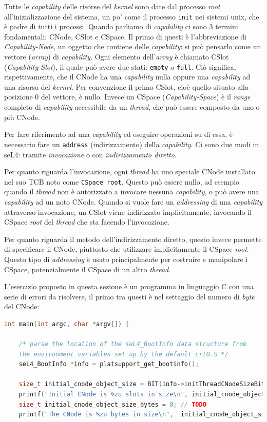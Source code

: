 Tutte le \textit{capability} delle risorse del \textit{kernel} sono date dal processo \textit{root} all'inizializzazione del sistema, un po' come il processo \texttt{init} nei sistemi unix, che è padre di tutti i processi. Quando parliamo di \textit{capability} ci sono 3 termini fondamentali: CNode, CSlot e CSpace. Il primo di questi è l'abbreviazione di \textit{Capability-Node}, un oggetto che contiene delle \textit{capability}: si può pensarlo come un vettore (\textit{array}) di \textit{capability}. Ogni elemento dell'\textit{array} è chiamato CSlot (\textit{Capability-Slot}), il quale può avere due stati: \texttt{empty} o \texttt{full}. Ciò significa, rispettivamente, che il CNode ha una \textit{capability} nulla oppure una \textit{capability} ad una risorsa del \textit{kernel}. Per convenzione il primo CSlot, cioè quello situato alla posizione 0 del vettore, è nullo. Invece un CSpace (\textit{Capability-Space}) è il \textit{range} completo di \textit{capability} accessibile da un \textit{thread}, che può essere composto da uno o più CNode.

Per fare riferimento ad una \textit{capability} ed eseguire operazioni su di essa, è necessario fare un \texttt{address} (indirizzamento) della \textit{capability}. Ci sono due modi in seL4: tramite \textit{invocazione} o con \textit{indirizzamento diretto}.

Per quanto riguarda l'invocazione, ogni \textit{thread} ha uno speciale CNode installato nel suo TCB noto come \texttt{CSpace root}. Questo può essere nullo, ad esempio quando il \textit{thread} non è autorizzato a invocare nessuna \textit{capability}, o può avere una \textit{capability} ad un noto CNode. Quando si vuole fare un \textit{addressing} di una \textit{capability} attraverso invocazione, un CSlot viene indirizzato implicitamente, invocando il CSpace \textit{root} del \textit{thread} che sta facendo l'invocazione.

Per quanto riguarda il metodo dell'indirizzamento diretto, questo invece permette di specificare il CNode, piuttosto che utilizzare implicitamente il CSpace \textit{root}. Questo tipo di \textit{addressing}  è usato principalmente per costruire e manipolare i CSpace, potenzialmente il CSpace di un altro \textit{thread}.

L'esercizio proposto in questa sezione è un programma in linguaggio C con una serie di errori da risolvere, il primo tra questi è nel settaggio del numero di \textit{byte} del CNode:
\begin{lstlisting}[language=C++]
int main(int argc, char *argv[]) {

    /* parse the location of the seL4_BootInfo data structure from
    the environment variables set up by the default crt0.S */
    seL4_BootInfo *info = platsupport_get_bootinfo();

    size_t initial_cnode_object_size = BIT(info->initThreadCNodeSizeBits);
    printf("Initial CNode is %zu slots in size\n", initial_cnode_object_size);
    size_t initial_cnode_object_size_bytes = 0; // TODO
    printf("The CNode is %zu bytes in size\n", 	initial_cnode_object_size_bytes);
\end{lstlisting}

